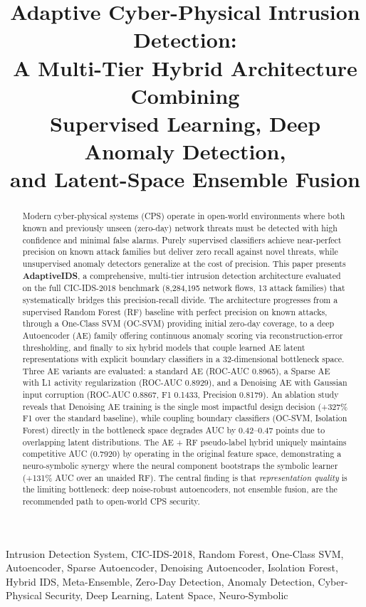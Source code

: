 \documentclass[10pt,journal,compsoc]{IEEEtran}
\title{Adaptive Cyber-Physical Intrusion Detection:\\A Multi-Tier Hybrid Architecture Combining\\Supervised Learning, Deep Anomaly Detection,\\and Latent-Space Ensemble Fusion}
\author{
  \IEEEauthorblockN{Pugazhendhi J}
  \IEEEauthorblockA{
    \textit{Department of CS and AI}\\
    Rishihood University, Sonipat, India\\
    \href{mailto:pugazhendhi.j23csai@nst.rishihood.edu.in}
         {pugazhendhi.j23csai@nst.rishihood.edu.in}}
  \and
  \IEEEauthorblockN{Dally R}
  \IEEEauthorblockA{
    \textit{Department of CS and AI}\\
    Rishihood University, Sonipat, India\\
    \href{mailto:dally.r23csai@nst.rishihood.edu.in}
         {dally.r23csai@nst.rishihood.edu.in}}
}
\begin{document}
\maketitle

\begin{abstract}
Modern cyber-physical systems (CPS) operate in open-world environments
where both known and previously unseen (zero-day) network threats must
be detected with high confidence and minimal false alarms.  Purely
supervised classifiers achieve near-perfect precision on known attack
families but deliver zero recall against novel threats, while
unsupervised anomaly detectors generalize at the cost of precision.
This paper presents \textbf{AdaptiveIDS}, a comprehensive, multi-tier
intrusion detection architecture evaluated on the full CIC-IDS-2018
benchmark (8{,}284{,}195 network flows, 13 attack families) that
systematically bridges this precision-recall divide.  The architecture
progresses from a supervised Random Forest (RF) baseline with perfect
precision on known attacks, through a One-Class SVM (OC-SVM) providing
initial zero-day coverage, to a deep Autoencoder (AE) family offering
continuous anomaly scoring via reconstruction-error thresholding, and
finally to six hybrid models that couple learned AE latent
representations with explicit boundary classifiers in a 32-dimensional
bottleneck space.  Three AE variants are evaluated: a standard AE
(ROC-AUC 0.8965), a Sparse AE with L1 activity regularization
(ROC-AUC 0.8929), and a Denoising AE with Gaussian input corruption
(ROC-AUC 0.8867, F1 0.1433, Precision 0.8179).  An ablation study
reveals that Denoising AE training is the single most impactful
design decision (+327\% F1 over the standard baseline), while coupling
boundary classifiers (OC-SVM, Isolation Forest) directly in the
bottleneck space degrades AUC by 0.42--0.47 points due to overlapping
latent distributions.  The AE + RF pseudo-label hybrid uniquely
maintains competitive AUC (0.7920) by operating in the original
feature space, demonstrating a neuro-symbolic synergy where the
neural component bootstraps the symbolic learner (+131\% AUC over an
unaided RF).  The central finding is that \emph{representation quality}
is the limiting bottleneck: deep noise-robust autoencoders, not
ensemble fusion, are the recommended path to open-world CPS security.
\end{abstract}

\begin{IEEEkeywords}
Intrusion Detection System, CIC-IDS-2018, Random Forest, One-Class SVM,
Autoencoder, Sparse Autoencoder, Denoising Autoencoder, Isolation Forest,
Hybrid IDS, Meta-Ensemble, Zero-Day Detection, Anomaly Detection,
Cyber-Physical Security, Deep Learning, Latent Space, Neuro-Symbolic
\end{IEEEkeywords}
\end{document}
